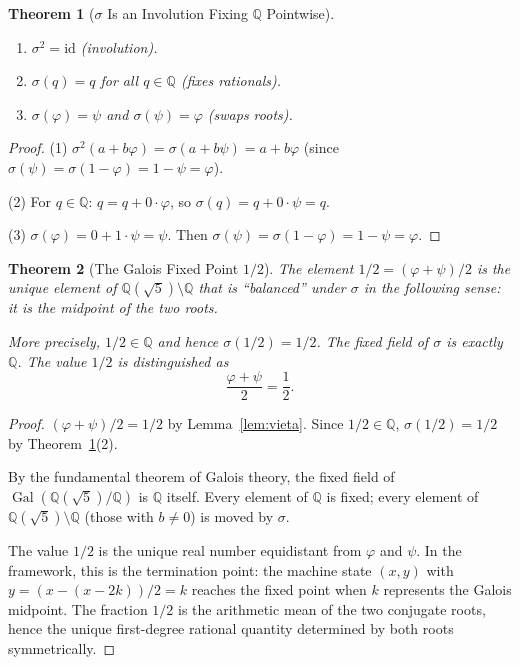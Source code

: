 \documentclass[11pt,a4paper]{article}
\theoremstyle{plain}
\newtheorem{theorem}{Theorem}[section]
\theoremstyle{definition}
\newcommand{\Q}{\mathbb{Q}}
\newcommand{\vp}{\varphi}
\newcommand{\ps}{\psi}
\DeclareMathOperator{\Gal}{Gal}
\begin{document}
\begin{theorem}[$\sigma$ Is an Involution Fixing $\Q$ Pointwise]\label{thm:involution}
\begin{enumerate}[nosep]
  \item $\sigma^{2} = \mathrm{id}$ (involution).
  \item $\sigma(q) = q$ for all $q \in \Q$ (fixes rationals).
  \item $\sigma(\vp) = \ps$ and $\sigma(\ps) = \vp$ (swaps roots).
\end{enumerate}
\end{theorem}

\begin{proof}
(1) $\sigma^{2}(a + b\vp) = \sigma(a + b\ps) = a + b\vp$ (since
$\sigma(\ps) = \sigma(1 - \vp) = 1 - \ps = \vp$).

(2) For $q \in \Q$: $q = q + 0 \cdot \vp$, so $\sigma(q) = q + 0 \cdot \ps = q$.

(3) $\sigma(\vp) = 0 + 1 \cdot \ps = \ps$.  Then $\sigma(\ps) =
\sigma(1 - \vp) = 1 - \ps = \vp$.
\end{proof}

\begin{theorem}[The Galois Fixed Point $1/2$]\label{thm:fixed-point}
The element $1/2 = (\vp + \ps)/2$ is the unique element of
$\Q(\sqrt{5}) \setminus \Q$ that is ``balanced'' under $\sigma$ in the
following sense: it is the midpoint of the two roots.

More precisely, $1/2 \in \Q$ and hence $\sigma(1/2) = 1/2$.  The
fixed field of $\sigma$ is exactly $\Q$.  The value $1/2$ is
distinguished as
\begin{equation}\label{eq:midpoint}
  \frac{\vp + \ps}{2} = \frac{1}{2}.
\end{equation}
\end{theorem}

\begin{proof}
$(\vp + \ps)/2 = 1/2$ by Lemma~\ref{lem:vieta}.  Since $1/2 \in \Q$,
$\sigma(1/2) = 1/2$ by Theorem~\ref{thm:involution}(2).

By the fundamental theorem of Galois theory, the fixed field of
$\Gal(\Q(\sqrt{5})/\Q)$ is $\Q$ itself.  Every element of $\Q$ is
fixed; every element of $\Q(\sqrt{5}) \setminus \Q$ (those with
$b \ne 0$) is moved by $\sigma$.

The value $1/2$ is the unique real number equidistant from $\vp$ and $\ps$.
In the framework, this is the termination point: the machine state
$(x, y)$ with $y = (x - (x - 2k))/2 = k$ reaches the fixed point when
$k$ represents the Galois midpoint.  The fraction $1/2$ is the arithmetic
mean of the two conjugate roots, hence the unique first-degree rational
quantity determined by both roots symmetrically.
\end{proof}
\end{document}
